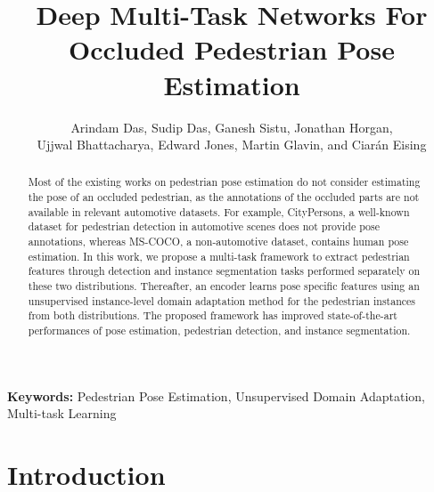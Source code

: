 \documentclass[a4paper,11pt]{article}
\begin{document}
\renewcommand{\thefootnote}{\alph{footnote}}


\title{Deep Multi-Task Networks For Occluded Pedestrian Pose Estimation}

\author{Arindam Das, Sudip Das, Ganesh Sistu, Jonathan Horgan, \\ Ujjwal Bhattacharya, Edward Jones, Martin Glavin, and Ciar\'{a}n Eising}




\vspace{-2cm}


\date{}
\maketitle


\vspace{-0.5cm}

\begin{abstract}
Most of the existing works on pedestrian pose estimation do not consider estimating the pose of an occluded pedestrian, as the annotations of the occluded parts are not available in relevant automotive datasets. For example, CityPersons, a well-known dataset for pedestrian detection in automotive scenes does not provide pose annotations, whereas MS-COCO, a  non-automotive dataset, contains human pose estimation. In this work, we propose a multi-task framework to extract pedestrian features through detection and instance segmentation tasks performed separately on these two distributions. Thereafter, an encoder learns pose specific features using an unsupervised instance-level domain adaptation method for the pedestrian instances from both distributions. The proposed framework has improved state-of-the-art performances of pose estimation, pedestrian detection, and instance segmentation. \end{abstract}
 

\textbf{Keywords:} Pedestrian Pose Estimation, Unsupervised Domain Adaptation, Multi-task Learning

\vspace{-0.3cm}



\section{Introduction}
\end{document}
